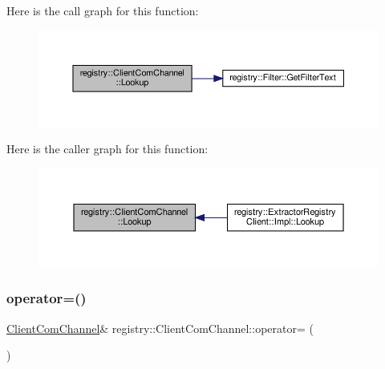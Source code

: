 Here is the call graph for this function\+:
\nopagebreak
\begin{figure}[H]
\begin{center}
\leavevmode
\includegraphics[width=350pt]{classregistry_1_1ClientComChannel_a564ba5480214a74c5697120084cafb54_cgraph}
\end{center}
\end{figure}
Here is the caller graph for this function\+:\nopagebreak
\begin{figure}[H]
\begin{center}
\leavevmode
\includegraphics[width=350pt]{classregistry_1_1ClientComChannel_a564ba5480214a74c5697120084cafb54_icgraph}
\end{center}
\end{figure}
\mbox{\label{classregistry_1_1ClientComChannel_a70bdd7f48a91b7f6c4cf226f9203efbe}} 
\subsubsection{\texorpdfstring{operator=()}{operator=()}\hspace{0.1cm}{\footnotesize\ttfamily [1/2]}}
{\footnotesize\ttfamily \hyperlink{classregistry_1_1ClientComChannel}{Client\+Com\+Channel}\& registry\+::\+Client\+Com\+Channel\+::operator= (\begin{DoxyParamCaption}\item[{\hyperlink{classregistry_1_1ClientComChannel}{Client\+Com\+Channel} const \&}]{ }\end{DoxyParamCaption})\hspace{0.3cm}{\ttfamily [delete]}}

